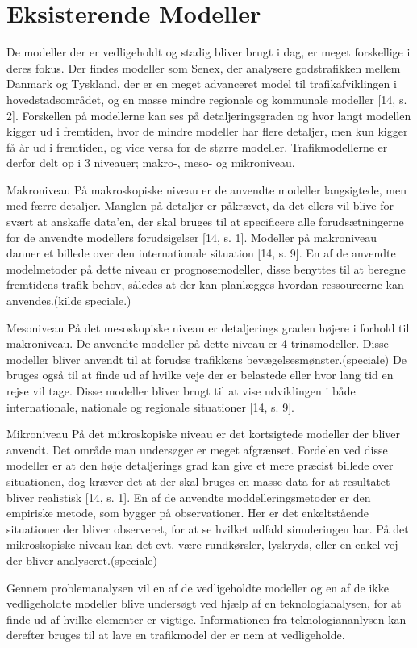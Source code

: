 \section{Eksisterende Modeller}
De modeller der er vedligeholdt og stadig bliver brugt i dag, er meget forskellige i deres fokus. Der findes modeller som Senex, der analysere godstrafikken mellem Danmark og Tyskland, der er en meget advanceret model til trafikafviklingen i hovedstadsområdet, og en masse mindre regionale og kommunale modeller [14, s. 2]. Forskellen på modellerne kan ses på detaljeringsgraden og hvor langt modellen kigger ud i fremtiden, hvor de mindre modeller har flere detaljer, men kun kigger få år ud i fremtiden, og vice versa for de større modeller. Trafikmodellerne er derfor delt op i 3 niveauer; makro-, meso- og mikroniveau.

\vspace{5mm}

Makroniveau
På makroskopiske niveau er de anvendte modeller langsigtede, men med færre detaljer. Manglen på detaljer er påkrævet, da det ellers vil blive for svært at anskaffe data’en, der skal bruges til at specificere alle forudsætningerne for de anvendte modellers forudsigelser [14, s. 1]. Modeller på makroniveau danner et billede over den internationale situation [14, s. 9]. En af de anvendte modelmetoder på dette niveau er prognosemodeller, disse benyttes til at beregne fremtidens trafik behov, således at der kan planlægges hvordan ressourcerne kan anvendes.(kilde speciale.)


\vspace{5mm}

Mesoniveau
På det mesoskopiske niveau er detaljerings graden højere i forhold til makroniveau. De anvendte modeller på dette niveau er 4-trinsmodeller. Disse modeller bliver anvendt til at forudse trafikkens bevægelsesmønster.(speciale) De bruges også til at finde ud af hvilke veje der er belastede eller hvor lang tid en rejse vil tage. Disse modeller bliver brugt til at vise udviklingen i både internationale, nationale og regionale situationer [14, s. 9].

\vspace{5mm}

Mikroniveau
På det mikroskopiske niveau er det kortsigtede modeller der bliver anvendt. Det område man undersøger er meget afgrænset. Fordelen ved disse modeller er at den høje detaljerings grad kan give et mere præcist billede over situationen, dog kræver det at der skal bruges en masse data for at resultatet bliver realistisk [14, s. 1]. En af de anvendte moddelleringsmetoder er den empiriske metode, som bygger på observationer. Her er det enkeltstående situationer der bliver observeret, for at se hvilket udfald simuleringen har. På det mikroskopiske niveau kan det evt. være rundkørsler, lyskryds, eller en enkel vej der bliver analyseret.(speciale)

\vspace{5mm}

Gennem problemanalysen vil en af de vedligeholdte modeller og en af de ikke vedligeholdte modeller blive undersøgt ved hjælp af en teknologianalysen, for at finde ud af hvilke elementer er vigtige. Informationen fra teknologiananlysen kan derefter bruges til at lave en trafikmodel der er nem at vedligeholde.